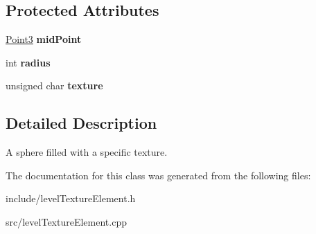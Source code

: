 \subsection*{\-Protected \-Attributes}
\begin{DoxyCompactItemize}
\item 
\hypertarget{classLevelTextureElementSolidSphere_a971eac3fdcf79c6562462c9b090b1fd3}{
\hyperlink{classPoint3}{\-Point3} {\bfseries mid\-Point}}
\label{d7/ded/classLevelTextureElementSolidSphere_a971eac3fdcf79c6562462c9b090b1fd3}

\item 
\hypertarget{classLevelTextureElementSolidSphere_a276c43ddb5c62c5057b0172278e0d0cb}{
int {\bfseries radius}}
\label{d7/ded/classLevelTextureElementSolidSphere_a276c43ddb5c62c5057b0172278e0d0cb}

\item 
\hypertarget{classLevelTextureElementSolidSphere_ad66c507c793e799cee1ed786c11074d7}{
unsigned char {\bfseries texture}}
\label{d7/ded/classLevelTextureElementSolidSphere_ad66c507c793e799cee1ed786c11074d7}

\end{DoxyCompactItemize}


\subsection{\-Detailed \-Description}
\-A sphere filled with a specific texture. 

\-The documentation for this class was generated from the following files\-:\begin{DoxyCompactItemize}
\item 
include/level\-Texture\-Element.\-h\item 
src/level\-Texture\-Element.\-cpp\end{DoxyCompactItemize}
